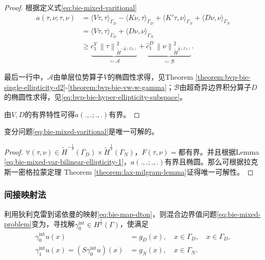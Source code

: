 \begin{proof}
  根据定义式\eqref{eq:bie-mixed-varitional}
  \begin{equation*}
    \begin{split}
      a(\tau, \nu ; \tau, \nu)
      & = \langle V \tau, \tau \rangle_{\Gamma_{D}}
      - \langle K \nu, \tau \rangle_{\Gamma_{D}}
      + \langle K' \tau, \nu \rangle_{\Gamma_{N}}
      + \langle D \nu, \nu \rangle_{\Gamma_{N}} \\
      & = \langle V \tau, \tau \rangle_{\Gamma_{D}}
      + \langle D \nu, \nu \rangle_{\Gamma_{N}} \\
      & \ge \underbrace{
      c_{1}^{V} \, \left\| \tau \right\|_{\widetilde{H}^{-\frac{1}{2}(\Gamma_{D})}}^{2}
      }_{\eqqcolon \mathcal{A}}
      + \underbrace{
      \widehat{c}_{1}^{D} \, \left\| \nu \right\|_{
      \widetilde{H}^{\frac{1}{2} (\Gamma_{N})}
      }^{2}
      }_{\eqqcolon \mathcal{B}}.
    \end{split}
  \end{equation*}

  最后一行中，$\mathcal{A}$由单层位势算子$V$的椭圆性求得，见Theorem \ref{theorem:bvp-bie-single-ellipticity-d2}-\ref{theorem:bvp-bie-vw-w-gamma}；$\mathcal{B}$由超奇异边界积分算子$D$的椭圆性求得，见\eqref{eq:bvp-bie-hyper-ellipticity-subspace}。

  由$V,D$的有界特性可得$a(.,.;.,.)$有界。
\end{proof}

\begin{lemma}
  \label{lemma:bie-mixed-var-bilinear-uniq}
  变分问题\eqref{eq:bie-mixed-varitional}是唯一可解的。
\end{lemma}
\begin{proof}
  $ \forall \left( \tau, \nu \right) \in \widetilde{H}^{-\frac{1}{2}}(\Gamma_{D}) \times \widetilde{H}^{\frac{1}{2}}(\Gamma_{N})$，$F(\tau, \nu) = $都有界。并且根据Lemma \ref{eq:bie-mixed-var-bilinear-ellipticity-1}，$a(.,.;.,.)$有界且椭圆。那么可根据拉克斯一密格拉蒙定理 Theorem \ref{theorem:lax-milgram-lemma}证得唯一可解性。
\end{proof}

\subsubsection{间接映射法}
利用狄利克雷到诺依曼的映射\eqref{eq:bie-map-dton}，则混合边界值问题\eqref{eq:bie-mixed-problem}变为，寻找解$\gamma_{0}^{\text{int}} \in H^{\frac{1}{2}}(\Gamma)$，使满足
\begin{equation*}
  \begin{split}
    \gamma_{0}^{\text{int}} u(x) & = g_{D} (x), \quad x \in \Gamma_{D}, \quad x \in \Gamma_{D},\\
    \gamma_{1}^{\text{int}} u(x)  = \left( S \gamma_{0}^{\text{int}} u \right)(x) & = g_{N}(x), \quad x \in \Gamma_{N}.
  \end{split}
\end{equation*}


